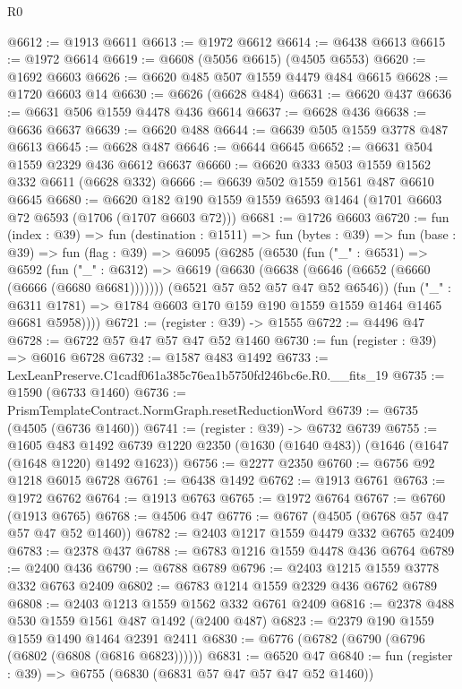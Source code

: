 \begin{lexlean}{R0}
\begin{coremodule}
@6612 := @1913 @6611
@6613 := @1972 @6612
@6614 := @6438 @6613
@6615 := @1972 @6614
@6619 := @6608 (@5056 @6615) (@4505 @6553)
@6620 := @1692 @6603
@6626 := @6620 @485 @507 @1559 @4479 @484 @6615
@6628 := @1720 @6603 @14
@6630 := @6626 (@6628 @484)
@6631 := @6620 @437
@6636 := @6631 @506 @1559 @4478 @436 @6614
@6637 := @6628 @436
@6638 := @6636 @6637
@6639 := @6620 @488
@6644 := @6639 @505 @1559 @3778 @487 @6613
@6645 := @6628 @487
@6646 := @6644 @6645
@6652 := @6631 @504 @1559 @2329 @436 @6612 @6637
@6660 := @6620 @333 @503 @1559 @1562 @332 @6611 (@6628 @332)
@6666 := @6639 @502 @1559 @1561 @487 @6610 @6645
@6680 := @6620 @182 @190 @1559 @1559 @6593 @1464 (@1701 @6603 @72 @6593 (@1706 (@1707 @6603 @72)))
@6681 := @1726 @6603
@6720 := fun (index : @39) =>
  fun (destination : @1511) =>
  fun (bytes : @39) =>
  fun (base : @39) =>
  fun (flag : @39) =>
  @6095
    (@6285
      (@6530
        (fun ("_" : @6531) =>
        @6592
          (fun ("_" : @6312) =>
          @6619
            (@6630 (@6638 (@6646 (@6652 (@6660 (@6666 (@6680 @6681)))))))
            (@6521 @57 @52 @57 @47 @52 @6546))
          (fun ("_" : @6311 @1781) =>
          @1784 @6603 @170 @159 @190 @1559 @1559 @1464 @1465 @6681 @5958))))
@6721 := (register : @39) -> @1555
@6722 := @4496 @47
@6728 := @6722 @57 @47 @57 @47 @52 @1460
@6730 := fun (register : @39) => @6016 @6728
@6732 := @1587 @483 @1492
@6733 := LexLeanPreserve.C1cadf061a385c76ea1b5750fd246bc6e.R0.__fits_19
@6735 := @1590 (@6733 @1460)
@6736 := PrismTemplateContract.NormGraph.resetReductionWord
@6739 := @6735 (@4505 (@6736 @1460))
@6741 := (register : @39) -> @6732 @6739
@6755 := @1605
    @483
    @1492
    @6739
    @1220
    @2350
    (@1630 (@1640 @483))
    (@1646 (@1647 (@1648 @1220) @1492 @1623))
@6756 := @2277 @2350
@6760 := @6756 @92 @1218 @6015 @6728
@6761 := @6438 @1492
@6762 := @1913 @6761
@6763 := @1972 @6762
@6764 := @1913 @6763
@6765 := @1972 @6764
@6767 := @6760 (@1913 @6765)
@6768 := @4506 @47
@6776 := @6767 (@4505 (@6768 @57 @47 @57 @47 @52 @1460))
@6782 := @2403 @1217 @1559 @4479 @332 @6765 @2409
@6783 := @2378 @437
@6788 := @6783 @1216 @1559 @4478 @436 @6764
@6789 := @2400 @436
@6790 := @6788 @6789
@6796 := @2403 @1215 @1559 @3778 @332 @6763 @2409
@6802 := @6783 @1214 @1559 @2329 @436 @6762 @6789
@6808 := @2403 @1213 @1559 @1562 @332 @6761 @2409
@6816 := @2378 @488 @530 @1559 @1561 @487 @1492 (@2400 @487)
@6823 := @2379 @190 @1559 @1559 @1490 @1464 @2391 @2411
@6830 := @6776 (@6782 (@6790 (@6796 (@6802 (@6808 (@6816 @6823))))))
@6831 := @6520 @47
@6840 := fun (register : @39) => @6755 (@6830 (@6831 @57 @47 @57 @47 @52 @1460))

\end{coremodule}
\end{lexlean}
